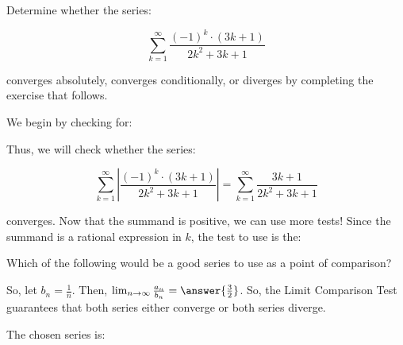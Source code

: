 \documentclass{ximera}
\author{Jim Talamo}
\begin{document}
\begin{exercise}

Determine whether the series:

\[
\sum_{k=1}^{\infty} \frac{(-1)^k \cdot(3k+1)}{2k^2+3k+1}
\]

converges absolutely, converges conditionally, or diverges by completing the exercise that follows.

We begin by checking for:

\begin{multipleChoice}
\end{multipleChoice}

Thus, we will check whether the series:

\[
\sum_{k=1}^{\infty} \left| \frac{(-1)^k \cdot(3k+1)}{2k^2+3k+1} \right| = \sum_{k=1}^{\infty} \frac{3k+1}{2k^2+3k+1}
\]

converges.  Now that the summand is positive, we can use more tests!  Since the summand is a rational expression in $k$, the test to use is the:
\begin{multipleChoice}
\end{multipleChoice}

\begin{exercise}
Which of the following would be a good series to use as a point of comparison?

\begin{multipleChoice}
\end{multipleChoice}

So, let $b_n = \frac{1}{n}$.  Then, $\lim_{n \to \infty} \frac{a_n}{b_n} = \answer{\frac{3}{2}}$.  So, the Limit Comparison Test guarantees that both series either converge or both series diverge.

The chosen series is:
\begin{multipleChoice}
\end{multipleChoice}


\end{exercise}
\end{exercise}
\end{document}
